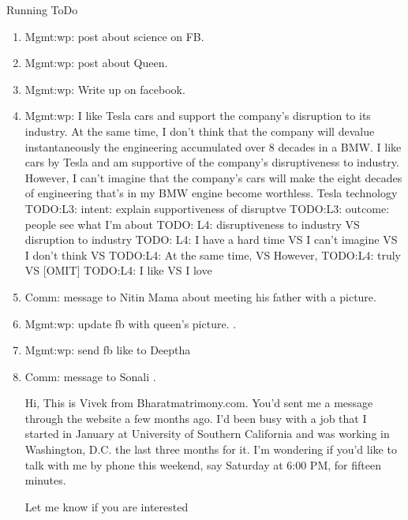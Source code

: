 \begin{columns}
\begin{column}{0.6\linewidth}
\begin{block}{Running ToDo}
\begin{enumerate}
          \item \tiny Mgmt:wp: post about science on FB. 
          \item \tiny Mgmt:wp: post about Queen. 
          \item \tiny Mgmt:wp: Write up on facebook.
           \item \tiny Mgmt:wp: I like Tesla cars and support the company's
             disruption to its industry. At the same time, I don’t think
             that the company will devalue instantaneously the engineering
             accumulated over 8 decades in a BMW.
             {I like cars by Tesla and am supportive of the company’s
               disruptiveness to industry. However, I can’t imagine
               that the company’s cars will make the eight decades of
               engineering that’s in my BMW engine become worthless.
               Tesla technology
               TODO:L3: intent: explain supportiveness of disruptve
               TODO:L3: outcome: people see what I’m about 
               TODO: L4: disruptiveness to industry VS disruption to industry 
               TODO: L4: I have a hard time VS I can’t imagine VS I don’t think  VS 
               TODO:L4: At the same time, VS However, 
               TODO:L4: truly VS [OMIT] 
               TODO:L4: I like VS I love} 
             
           \item \tiny Comm: message to Nitin Mama about meeting his
             father with a picture. 

           \item \tiny Mgmt:wp: update fb with queen's picture. . 

             \item \tiny Mgmt:wp: send fb like to Deeptha
             \item \tiny Comm: message to Sonali . 

               Hi, This is Vivek from Bharatmatrimony.com. You'd sent
               me a message through the website a few months ago. I'd
               been busy with a job that I started in
               January at University of Southern California and was working in
               Washington, D.C. the last three months for it.
               I'm wondering if you'd like to talk with me by
               phone this weekend, say Saturday at 6:00 PM, for
               fifteen minutes.

               Let me know if you are interested 



\end{enumerate}
\end{block}
\end{column}
\end{columns}

